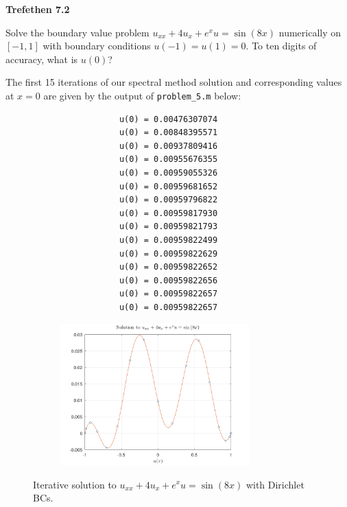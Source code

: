 \textbf{Trefethen 7.2}

Solve the boundary value problem $u_{xx} + 4u_x + e^x u = \sin{(8x)}$ numerically on $[-1, 1]$ with boundary 
conditions $u(-1) = u(1) = 0$. To ten digits of accuracy, what is $u(0)$?

\begin{solution}
  The first 15 iterations of our spectral method solution and corresponding values at $x = 0$ are given by the output
  of \texttt{problem\_5.m} below:

  \begin{figure}[h]
    \begin{subfigure}[b]{0.9\textwidth}
      \begin{verbatim}
            u(0) = 0.00476307074
            u(0) = 0.00848395571
            u(0) = 0.00937809416
            u(0) = 0.00955676355
            u(0) = 0.00959055326
            u(0) = 0.00959681652
            u(0) = 0.00959796822
            u(0) = 0.00959817930
            u(0) = 0.00959821793
            u(0) = 0.00959822499
            u(0) = 0.00959822629
            u(0) = 0.00959822652
            u(0) = 0.00959822656
            u(0) = 0.00959822657
            u(0) = 0.00959822657
      \end{verbatim}
    \end{subfigure}
    \begin{subfigure}[b]{0.9\textwidth}
      \centering
      \includegraphics[width=0.8\textwidth]{problem_5.png}
    \end{subfigure}
    \caption{Iterative solution to $u_{xx} + 4u_x + e^x u = \sin{(8x)}$ with Dirichlet BCs.}
    \label{fig:bvp_problem_5}
  \end{figure}
  \ \\
\end{solution}